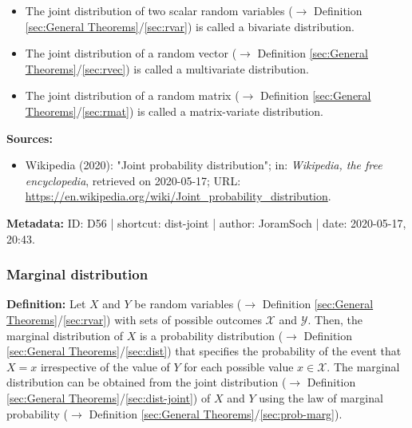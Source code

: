 \documentclass[a4paper,12pt,twoside]{book}
\begin{document}
\begin{itemize}

\item The joint distribution of two scalar random variables ($\rightarrow$ Definition \ref{sec:General Theorems}/\ref{sec:rvar}) is called a bivariate distribution.

\item The joint distribution of a random vector ($\rightarrow$ Definition \ref{sec:General Theorems}/\ref{sec:rvec}) is called a multivariate distribution.

\item The joint distribution of a random matrix ($\rightarrow$ Definition \ref{sec:General Theorems}/\ref{sec:rmat}) is called a matrix-variate distribution.

\end{itemize}


\vspace{1em}
\textbf{Sources:}
\begin{itemize}
\item Wikipedia (2020): "Joint probability distribution"; in: \textit{Wikipedia, the free encyclopedia}, retrieved on 2020-05-17; URL: \url{https://en.wikipedia.org/wiki/Joint_probability_distribution}.
\end{itemize}


\vspace{1em}
\textbf{Metadata:} ID: D56 | shortcut: dist-joint | author: JoramSoch | date: 2020-05-17, 20:43.
\vspace{1em}



\subsubsection[\textit{Marginal distribution}]{Marginal distribution} \label{sec:dist-marg}
\setcounter{equation}{0}

\textbf{Definition:} Let $X$ and $Y$ be random variables ($\rightarrow$ Definition \ref{sec:General Theorems}/\ref{sec:rvar}) with sets of possible outcomes $\mathcal{X}$ and $\mathcal{Y}$. Then, the marginal distribution of $X$ is a probability distribution ($\rightarrow$ Definition \ref{sec:General Theorems}/\ref{sec:dist}) that specifies the probability of the event that $X = x$ irrespective of the value of $Y$ for each possible value $x \in \mathcal{X}$. The marginal distribution can be obtained from the joint distribution ($\rightarrow$ Definition \ref{sec:General Theorems}/\ref{sec:dist-joint}) of $X$ and $Y$ using the law of marginal probability ($\rightarrow$ Definition \ref{sec:General Theorems}/\ref{sec:prob-marg}).
\end{document}
